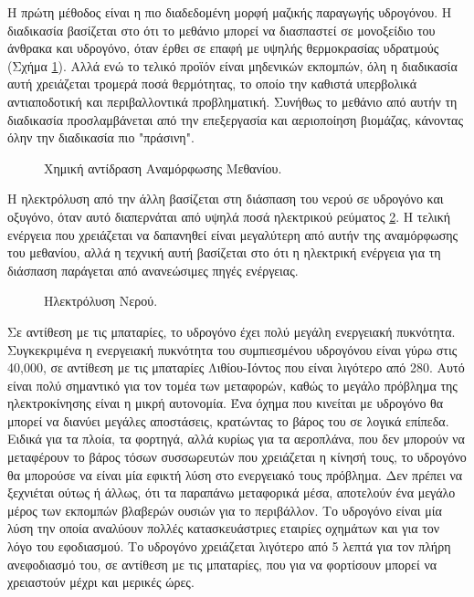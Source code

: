 \documentclass[12pt]{report}
\begin{document}
Η πρώτη μέθοδος είναι η πιο διαδεδομένη μορφή μαζικής παραγωγής υδρογόνου. Η διαδικασία βασίζεται στο ότι το μεθάνιο μπορεί να διασπαστεί σε μονοξείδιο του άνθρακα και υδρογόνο, όταν έρθει σε επαφή με υψηλής 
θερμοκρασίας υδρατμούς (Σχήμα \ref{eq:reform}). Αλλά ενώ το τελικό προϊόν είναι μηδενικών εκπομπών, όλη η διαδικασία αυτή χρειάζεται τρομερά ποσά θερμότητας, το οποίο την καθιστά υπερβολικά αντιαποδοτική και 
περιβαλλοντικά προβληματική. Συνήθως το μεθάνιο από αυτήν τη διαδικασία προσλαμβάνεται από την επεξεργασία και αεριοποίηση βιομάζας, κάνοντας όλην την διαδικασία πιο "πράσινη".

\begin{figure}[h]
				\center
				{}
				\caption{Χημική αντίδραση Αναμόρφωσης Μεθανίου.}
				\label{eq:reform}
\end{figure}

Η ηλεκτρόλυση από την άλλη βασίζεται στη διάσπαση του νερού σε υδρογόνο και οξυγόνο, όταν αυτό διαπερνάται από υψηλά ποσά ηλεκτρικού ρεύματος \ref{eq:electrolysis}. Η τελική ενέργεια που χρειάζεται να δαπανηθεί είναι
μεγαλύτερη από αυτήν της αναμόρφωσης του μεθανίου, αλλά η τεχνική αυτή βασίζεται στο ότι η ηλεκτρική ενέργεια για τη διάσπαση παράγεται από ανανεώσιμες πηγές ενέργειας. 

\begin{figure}[h]
				\center
				{}
				\caption{Ηλεκτρόλυση Νερού.}
				\label{eq:electrolysis}
\end{figure}

Σε αντίθεση με τις μπαταρίες, το υδρογόνο έχει πολύ μεγάλη ενεργειακή πυκνότητα.
Συγκεκριμένα η ενεργειακή πυκνότητα του συμπιεσμένου υδρογόνου είναι γύρω στις 40,000{}, σε αντίθεση με τις μπαταρίες Λιθίου-Ιόντος που είναι λιγότερο από 280{}. Αυτό είναι 
πολύ σημαντικό για τον τομέα των μεταφορών, καθώς το μεγάλο πρόβλημα της ηλεκτροκίνησης είναι η μικρή αυτονομία. Ένα όχημα που κινείται με υδρογόνο θα μπορεί να διανύει μεγάλες αποστάσεις, κρατώντας το βάρος του σε λογικά επίπεδα.
Ειδικά για τα πλοία, τα φορτηγά, αλλά κυρίως για τα αεροπλάνα, που δεν μπορούν να μεταφέρουν το βάρος τόσων συσσωρευτών που χρειάζεται η κίνησή τους, το υδρογόνο θα μπορούσε να είναι μία εφικτή λύση στο ενεργειακό τους πρόβλημα. 
Δεν πρέπει να ξεχνιέται ούτως ή άλλως, ότι τα παραπάνω μεταφορικά μέσα, αποτελούν ένα μεγάλο μέρος των εκπομπών βλαβερών ουσιών για το περιβάλλον. Το υδρογόνο είναι μία λύση την οποία αναλύουν πολλές κατασκευάστριες εταιρίες 
οχημάτων και για τον λόγο του εφοδιασμού. Το υδρογόνο χρειάζεται λιγότερο από 5 λεπτά για τον πλήρη ανεφοδιασμό του, σε αντίθεση με τις μπαταρίες, που για να φορτίσουν μπορεί να χρειαστούν μέχρι και μερικές ώρες. 
\end{document}
